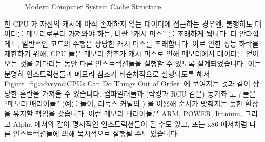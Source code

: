 \begin{figure}[htb]
\centering
{}
\caption{Modern Computer System Cache Structure}
\label{fig:advsync:Modern Computer System Cache Structure}
\end{figure}

한 CPU 가 자신의 캐시에 아직 존재하지 않는 데이터에 접근하는 경우엔, 불행히도
데이터를 메모리로부터 가져와야 하는, 비싼 ``캐시 미스'' 를 초래하게 됩니다.
더 안타깝게도, 일반적인 코드의 수행은 상당한 캐시 미스를 초래합니다.
이로 인한 성능 하락을 제한하기 위해, CPU 들은 메모리 참조가 캐시 미스로 인해
메모리에서 데이터를 얻어오는 것을 기다리는 동안 다른 인스트럭션들을 실행할 수
있도록 설계되었습니다.
이는 분명히 인스트럭션들과 메모리 참조가 비순차적으로 실행되도록 해서
Figure~\ref{fig:advsync:CPUs Can Do Things Out of Order} 에 보여지는 것과 같이
상당한 혼란을 가져올 수 있습니다.
컴파일러들과 (락킹과 RCU 같은) 동기화 도구들은 ``메모리 배리어들'' (예를 들어,
리눅스 커널의 ) 을 이용해 순서가 맞춰지는 듯한 환상을 유지할
책임을 갖습니다.
이런 메모리 배리어들은 ARM, POWER, Itanium, 그리고 Alpha 에서와 같이 명시적인
인스트럭션들이 될 수도 있고, 또는 x86 에서처럼 다른 인스트럭션들에 의해
묵시적으로 실행될 수도 있습니다.

